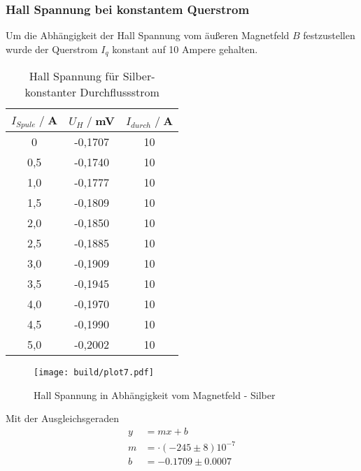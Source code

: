 \subsubsection{Hall Spannung bei konstantem Querstrom}
Um die Abhängigkeit der Hall Spannung vom äußeren Magnetfeld $B$ festzustellen wurde der Querstrom $I_q$ konstant auf 10 Ampere gehalten.
\begin{table}
    \centering
    \begin{tabular}{c c c}
        \toprule
        $I_{Spule} \;/\;$A & $U_H\;/\;$mV & $I_{durch} \;/\;$A\\
        \midrule
            0                   &-0,1707&             10\\
            0,5                 &-0,1740&             10\\
            1,0                 &-0,1777&             10\\
            1,5                 &-0,1809&             10\\
            2,0                 &-0,1850&             10\\
            2,5                 &-0,1885&             10\\
            3,0                 &-0,1909&             10\\
            3,5                 &-0,1945&             10\\
            4,0                 &-0,1970&             10\\
            4,5                 &-0,1990&             10\\
            5,0                 &-0,2002&             10\\
       \bottomrule
    \end{tabular}
    \caption{Hall Spannung für Silber- konstanter Durchflussstrom}
    \label{tab:Ag_I}
\end{table}
\begin{figure}[H]
    \centering
    \texttt{[image: build/plot7.pdf]}
    \caption{Hall Spannung in Abhängigkeit vom Magnetfeld - Silber}
    \label{fig:Ag_B}
\end{figure}
Mit der Ausgleichsgeraden
\begin{align*}
    y &= mx + b\\
    m &= \cdot (-245 \pm 8)10^{-7}\\
    b &=  -0.1709\pm 0.0007 \\ %
\end{align*}


